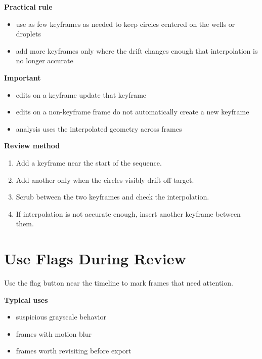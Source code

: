 \documentclass[
  9pt,
  letterpaper,
  oneside,
  open=any,
  DIV=15,
  parskip=half-,
  headings=big,
  numbers=noenddot
]{scrbook}
\newcommand{\manuallead}[1]{%
  \vspace{0.15em}%
  {\sffamily\bfseries\color{ManualBlue}#1}\par\nobreak\vspace{0.05em}%
}
\begin{document}
\manuallead{Practical rule}

\begin{itemize}[leftmargin=*,itemsep=0.35em,topsep=0.4em]
\item use as few keyframes as needed to keep circles centered on the wells or droplets
\item add more keyframes only where the drift changes enough that interpolation is no longer accurate
\end{itemize}

\manuallead{Important}

\begin{itemize}[leftmargin=*,itemsep=0.35em,topsep=0.4em]
\item edits on a keyframe update that keyframe
\item edits on a non-keyframe frame do not automatically create a new keyframe
\item analysis uses the interpolated geometry across frames
\end{itemize}

\manuallead{Review method}

\begin{enumerate}[leftmargin=*,itemsep=0.35em,topsep=0.4em]
\item Add a keyframe near the start of the sequence.
\item Add another only when the circles visibly drift off target.
\item Scrub between the two keyframes and check the interpolation.
\item If interpolation is not accurate enough, insert another keyframe between them.
\end{enumerate}

\section{Use Flags During Review}

Use the flag button near the timeline to mark frames that need attention.


\manuallead{Typical uses}

\begin{itemize}[leftmargin=*,itemsep=0.35em,topsep=0.4em]
\item suspicious grayscale behavior
\item frames with motion blur
\item frames worth revisiting before export
\end{itemize}
\end{document}

